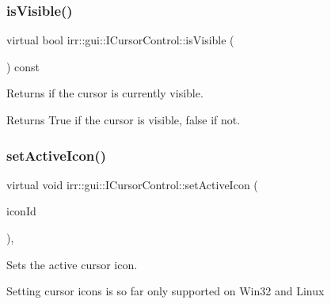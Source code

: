 \subsubsection{\texorpdfstring{is\+Visible()}{isVisible()}}
{\footnotesize\ttfamily virtual bool irr\+::gui\+::\+I\+Cursor\+Control\+::is\+Visible (\begin{DoxyParamCaption}{ }\end{DoxyParamCaption}) const\hspace{0.3cm}{\ttfamily [pure virtual]}}



Returns if the cursor is currently visible. 

\begin{DoxyReturn}{Returns}
True if the cursor is visible, false if not. 
\end{DoxyReturn}
\mbox{\label{classirr_1_1gui_1_1ICursorControl_af394700d5279b13cc0f2bcdad679469c}} 
\subsubsection{\texorpdfstring{set\+Active\+Icon()}{setActiveIcon()}}
{\footnotesize\ttfamily virtual void irr\+::gui\+::\+I\+Cursor\+Control\+::set\+Active\+Icon (\begin{DoxyParamCaption}\item[{\hyperlink{namespaceirr_1_1gui_aefee802dd632c5735703e40ef40f879b}{E\+C\+U\+R\+S\+O\+R\+\_\+\+I\+C\+ON}}]{icon\+Id }\end{DoxyParamCaption})\hspace{0.3cm}{\ttfamily [inline]}, {\ttfamily [virtual]}}



Sets the active cursor icon. 

Setting cursor icons is so far only supported on Win32 and Linux \mbox{\label{classirr_1_1gui_1_1ICursorControl_a951b5afe97fa21d98ce5360d96314306}} 

